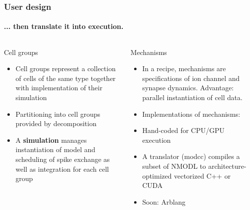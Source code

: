 \documentclass[t]{beamer}
\begin{document}
\begin{frame}\footnotesize
    \frametitle{User design}
    \framesubtitle{... then translate it into execution.}
\begin{columns}
    \begin{column}{0.45\textwidth}
    \begin{block}{Cell groups}
        \begin{itemize}
        \item Cell groups represent a collection of cells of the same type together with implementation of their simulation
        \item Partitioning into cell groups provided by decomposition
        \item A \textbf{simulation} manages instantiation of model and scheduling of spike exchange as well as integration for each cell group
        \end{itemize}
    \end{block}
    \end{column}
    \begin{column}{0.55\textwidth}
    \begin{block}{Mechanisms}
        \begin{itemize}
        \item In a recipe, mechanisms are specifications of ion channel and synapse dynamics. Advantage: parallel instantiation of cell data.
        \item[] Implementations of mechanisms:
        \item Hand-coded for CPU/GPU execution
        \item A translator (modcc) compiles a subset of NMODL to architecture-optimized vectorized C++ or CUDA
        \item Soon: Arblang
        \end{itemize}
    \end{block}
    \end{column}
\end{columns}
\end{frame}

\end{document}
